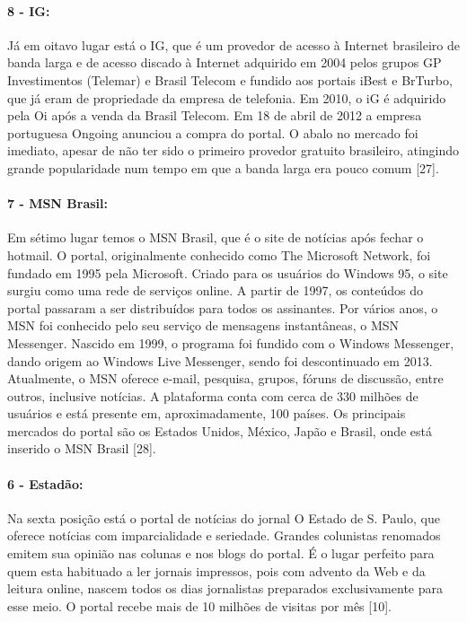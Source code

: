 \documentclass[a4paper]{article}
\begin{document}
\begin{titlepage}
\paragraph{8 - IG: }

Já em oitavo lugar está o IG, que é um provedor de acesso à Internet brasileiro de banda larga e de acesso discado à Internet adquirido em 2004 pelos grupos GP Investimentos (Telemar) e Brasil Telecom e fundido aos portais iBest e BrTurbo, que já eram de propriedade da empresa de telefonia. Em 2010, o iG é adquirido pela Oi após a venda da Brasil Telecom. Em 18 de abril de 2012 a empresa portuguesa Ongoing anunciou a compra do portal. O abalo no mercado foi imediato, apesar de não ter sido o primeiro provedor gratuito brasileiro, atingindo grande popularidade num tempo em que a banda larga era pouco comum [27].

\paragraph{7 - MSN Brasil: }

Em sétimo lugar temos o MSN Brasil, que é o site de notícias após fechar o hotmail. O portal, originalmente conhecido como The Microsoft Network, foi fundado em 1995 pela Microsoft. Criado para os usuários do Windows 95, o site surgiu como uma rede de serviços online. A partir de 1997, os conteúdos do portal passaram a ser distribuídos para todos os assinantes. Por vários anos, o MSN foi conhecido pelo seu serviço de mensagens instantâneas, o MSN Messenger. Nascido em 1999, o programa foi fundido com o Windows Messenger, dando origem ao Windows Live Messenger, sendo foi descontinuado em 2013. Atualmente, o MSN oferece e-mail, pesquisa, grupos, fóruns de discussão, entre outros, inclusive notícias. A plataforma conta com cerca de 330 milhões de usuários e está presente em, aproximadamente, 100 países. Os principais mercados do portal são os Estados Unidos, México, Japão e Brasil, onde está inserido o MSN Brasil [28].

\paragraph{6 - Estadão: }

Na sexta posição está o portal de notícias do jornal O Estado de S. Paulo, que oferece notícias com imparcialidade e seriedade. Grandes colunistas renomados emitem sua opinião nas colunas e nos blogs do portal. É o lugar perfeito para quem esta habituado a ler jornais impressos, pois com advento da Web e da leitura online, nascem todos os dias jornalistas preparados exclusivamente para esse meio. O portal recebe mais de 10 milhões de visitas por mês [10].


\end{titlepage}
\end{document}
